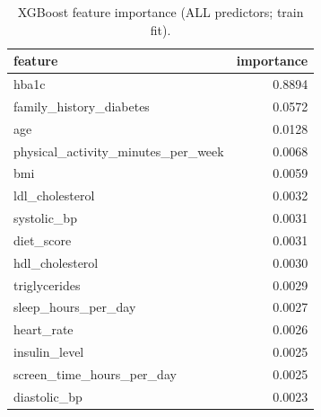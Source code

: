 \begin{table}[H]
\begin{center}
\begin{tabular}{lr}
\toprule
feature & importance \\
\midrule
hba1c & 0.8894 \\
family\_history\_diabetes & 0.0572 \\
age & 0.0128 \\
physical\_activity\_minutes\_per\_week & 0.0068 \\
bmi & 0.0059 \\
ldl\_cholesterol & 0.0032 \\
systolic\_bp & 0.0031 \\
diet\_score & 0.0031 \\
hdl\_cholesterol & 0.0030 \\
triglycerides & 0.0029 \\
sleep\_hours\_per\_day & 0.0027 \\
heart\_rate & 0.0026 \\
insulin\_level & 0.0025 \\
screen\_time\_hours\_per\_day & 0.0025 \\
diastolic\_bp & 0.0023 \\
\bottomrule
\end{tabular}
\end{center}
\vspace{-5pt}
\caption{XGBoost feature importance (ALL predictors; train fit).}
\label{tab:xgb_importance_all}
\end{table}
